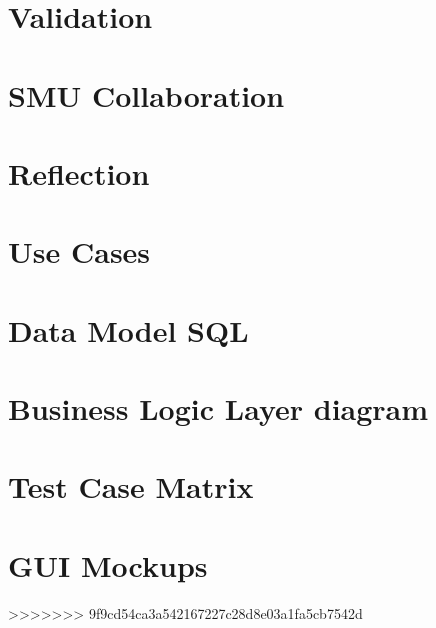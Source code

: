 \documentclass{report}
\begin{document}
\chapter{Validation}


\chapter{SMU Collaboration}


\chapter{Reflection}


\appendix

\chapter{Use Cases}


\chapter{Data Model SQL}
\label{app:sql}


\chapter{Business Logic Layer diagram}


\chapter{Test Case Matrix}
\label{app:testcasematrix}


\chapter{GUI Mockups}
\label{app:mockups}

>>>>>>> 9f9cd54ca3a542167227c28d8e03a1fa5cb7542d
\end{document}

